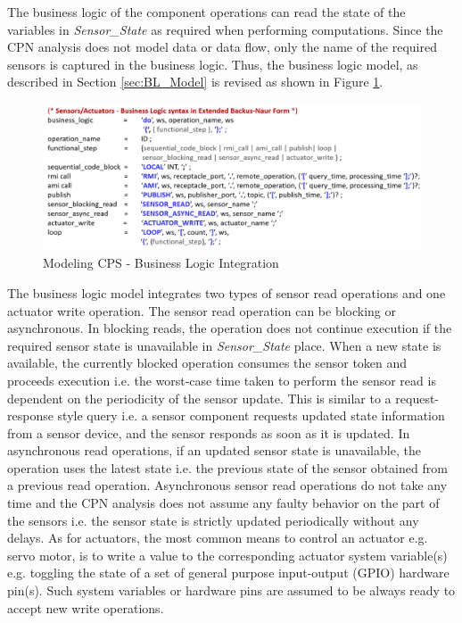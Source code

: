 The business logic of the component operations can read the state of the variables in \emph{Sensor\_State} as required when performing computations. Since the CPN analysis does not model data or data flow, only the name of the required sensors is captured in the business logic. Thus, the business logic model, as described in Section \ref{sec:BL_Model} is revised as shown in Figure \ref{fig:cps_bl}.

\begin{figure}[ht]
	\centering
	\includegraphics[width=\textwidth]{./img/cps_bl}
	\caption{Modeling CPS - Business Logic Integration}
	\label{fig:cps_bl}
\end{figure}
\FloatBarrier

The business logic model integrates two types of sensor read operations and one actuator write operation. The sensor read operation can be blocking or asynchronous. In blocking reads, the operation does not continue execution if the required sensor state is unavailable in \emph{Sensor\_State} place. When a new state is available, the currently blocked operation consumes the sensor token and proceeds execution i.e. the worst-case time taken to perform the sensor read is dependent on the periodicity of the sensor update. This is similar to a request-response style query i.e. a sensor component requests updated state information from a sensor device, and the sensor responds as soon as it is updated. In asynchronous read operations, if an updated sensor state is unavailable, the operation uses the latest state i.e. the previous state of the sensor obtained from a previous read operation. Asynchronous sensor read operations do not take any time and the CPN analysis does not assume any faulty behavior on the part of the sensors i.e. the sensor state is strictly updated periodically without any delays. As for actuators, the most common means to control an actuator e.g. servo motor, is to write a value to the corresponding actuator system variable(s) e.g. toggling the state of a set of general purpose input-output (GPIO) hardware pin(s). Such system variables or hardware pins are assumed to be always ready to accept new write operations. 

